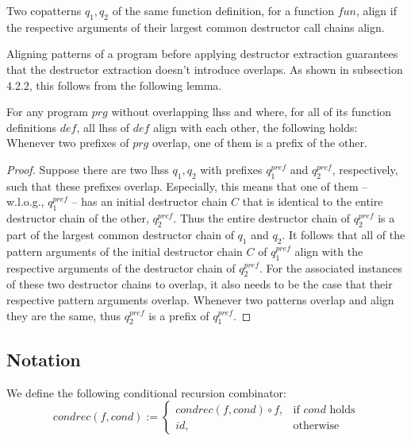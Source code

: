 \begin{definition}
Two copatterns $q_1, q_2$ of the same function definition, for a function $fun$, align if the respective arguments of their largest common destructor call chains align.
\end{definition}

Aligning patterns of a program before applying destructor extraction guarantees that the destructor extraction doesn't introduce overlaps. As shown in subsection 4.2.2, this follows from the following lemma.

\begin{lemma}
For any program $prg$ without overlapping lhss and where, for all of its function definitions $def$, all lhss of $def$ align with each other, the following holds: Whenever two prefixes of $prg$ overlap, one of them is a prefix of the other.

\begin{proof}
Suppose there are two lhss $q_1, q_2$ with prefixes $q^{\mathit{pref}}_1$ and $q^{\mathit{pref}}_2$, respectively, such that these prefixes overlap. Especially, this means that one of them -- w.l.o.g., $q^{\mathit{pref}}_1$ -- has an initial destructor chain $C$ that is identical to the entire destructor chain of the other, $q^{\mathit{pref}}_2$. Thus the entire destructor chain of $q^{\mathit{pref}}_2$ is a part of the largest common destructor chain of $q_1$ and $q_2$. It follows that all of the pattern arguments of the initial destructor chain $C$ of $q^{\mathit{pref}}_1$ align with the respective arguments of the destructor chain of $q^{\mathit{pref}}_2$. For the associated instances of these two destructor chains to overlap, it also needs to be the case that their respective pattern arguments overlap. Whenever two patterns overlap and align they are the same, thus $q^{\mathit{pref}}_2$ is a prefix of $q^{\mathit{pref}}_1$.
\end{proof}
\end{lemma}

\subsection{Notation}

We define the following conditional recursion combinator:
\[
    condrec(f, cond) :=
\begin{cases}
    condrec(f, cond) \circ f,& \text{if $cond$ holds} \\
   id,& \text{otherwise}
\end{cases}
\]

